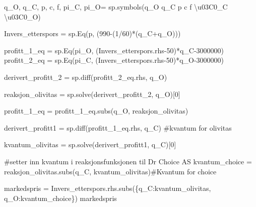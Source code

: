 \documentclass[
  12pt,
  a4paper,
  DIV=11,
  numbers=noendperiod]{scrartcl}
\newenvironment{Shaded}{\begin{snugshade}}{\end{snugshade}}
\newcommand{\CharTok}[1]{\textcolor[rgb]{0.13,0.47,0.30}{#1}}
\newcommand{\CommentTok}[1]{\textcolor[rgb]{0.37,0.37,0.37}{#1}}
\newcommand{\DecValTok}[1]{\textcolor[rgb]{0.68,0.00,0.00}{#1}}
\newcommand{\NormalTok}[1]{\textcolor[rgb]{0.00,0.23,0.31}{#1}}
\newcommand{\OperatorTok}[1]{\textcolor[rgb]{0.37,0.37,0.37}{#1}}
\newcommand{\StringTok}[1]{\textcolor[rgb]{0.13,0.47,0.30}{#1}}
\begin{document}
\begin{Shaded}
\begin{Highlighting}[]
\NormalTok{q\_O, q\_C, p, c, f, pi\_C, pi\_O}\OperatorTok{=}\NormalTok{ sp.symbols(}\StringTok{\textquotesingle{}q\_O q\_C p c f }\CharTok{\textbackslash{}u03C0}\StringTok{\_C }\CharTok{\textbackslash{}u03C0}\StringTok{\_O\textquotesingle{}}\NormalTok{)}

\NormalTok{Invers\_etterspors }\OperatorTok{=}\NormalTok{ sp.Eq(p, (}\DecValTok{990}\OperatorTok{{-}}\NormalTok{(}\DecValTok{1}\OperatorTok{/}\DecValTok{60}\NormalTok{)}\OperatorTok{*}\NormalTok{(q\_C}\OperatorTok{+}\NormalTok{q\_O)))}


\NormalTok{profitt\_1\_eq }\OperatorTok{=}\NormalTok{ sp.Eq(pi\_O, (Invers\_etterspors.rhs}\OperatorTok{{-}}\DecValTok{50}\NormalTok{)}\OperatorTok{*}\NormalTok{q\_C}\OperatorTok{{-}}\DecValTok{3000000}\NormalTok{)}
\NormalTok{profitt\_2\_eq }\OperatorTok{=}\NormalTok{ sp.Eq(pi\_C, (Invers\_etterspors.rhs}\OperatorTok{{-}}\DecValTok{50}\NormalTok{)}\OperatorTok{*}\NormalTok{q\_O}\OperatorTok{{-}}\DecValTok{3000000}\NormalTok{)}


\NormalTok{derivert\_profitt\_2 }\OperatorTok{=}\NormalTok{ sp.diff(profitt\_2\_eq.rhs, q\_O)}

\NormalTok{reaksjon\_olivitas }\OperatorTok{=}\NormalTok{ sp.solve(derivert\_profitt\_2, q\_O)[}\DecValTok{0}\NormalTok{]}

\NormalTok{profitt\_1\_eq }\OperatorTok{=}\NormalTok{ profitt\_1\_eq.subs(q\_O, reaksjon\_olivitas)}

\NormalTok{derivert\_profitt1 }\OperatorTok{=}\NormalTok{ sp.diff(profitt\_1\_eq.rhs, q\_C) }\CommentTok{\#kvantum for olivitas}

\NormalTok{kvantum\_olivitas }\OperatorTok{=}\NormalTok{ sp.solve(derivert\_profitt1, q\_C)[}\DecValTok{0}\NormalTok{]}

\CommentTok{\#setter inn kvantum i reaksjonsfunksjonen til Dr Choice AS}
\NormalTok{kvantum\_choice }\OperatorTok{=}\NormalTok{ reaksjon\_olivitas.subs(q\_C, kvantum\_olivitas)}\CommentTok{\#Kvantum for choice}
\end{Highlighting}
\end{Shaded}

\begin{Shaded}
\begin{Highlighting}[]
\NormalTok{markedspris }\OperatorTok{=}\NormalTok{ Invers\_etterspors.rhs.subs(\{q\_C:kvantum\_olivitas, q\_O:kvantum\_choice\})}
\NormalTok{markedspris}
\end{Highlighting}
\end{Shaded}
\end{document}
